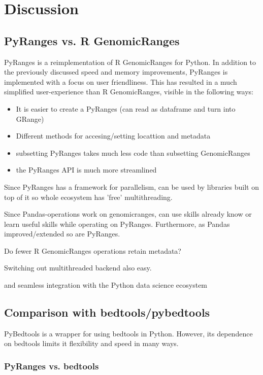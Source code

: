 \documentclass[10pt,letterpaper]{article}
\begin{document}
\section*{Discussion}

\subsection*{PyRanges vs. R GenomicRanges}

PyRanges is a reimplementation of R GenomicRanges for Python. In addition to the
previously discussed speed and memory improvements, PyRanges is implemented with
a focus on user friendliness. This has resulted in a much simplified
user-experience than R GenomicRanges, visible in the following ways:

\begin{itemize}
  \item It is easier to create a PyRanges (can read as dataframe and turn into GRange)
  \item Different methods for accesing/setting locattion and metadata
  \item subsetting PyRanges takes much less code than subsetting GenomicRanges
  \item the PyRanges API is much more streamlined
\end{itemize}

Since PyRanges has a framework for parallelism, can be used by libraries built
on top of it so whole ecosystem has 'free' multithreading.

Since Pandas-operations work on genomicranges, can use skills already know or
learn useful skills while operating on PyRanges. Furthermore, as Pandas
improved/extended so are PyRanges.

Do fewer R GenomicRanges operations retain metadata?

Switching out multithreaded backend also easy.

and seamless integration with the Python data
science ecosystem

\subsection*{Comparison with bedtools/pybedtools}

PyBedtools is a wrapper for using bedtools in Python. However, its dependence on
bedtools limits it flexibility and speed in many ways.

\subsubsection*{PyRanges vs. bedtools}
\end{document}
